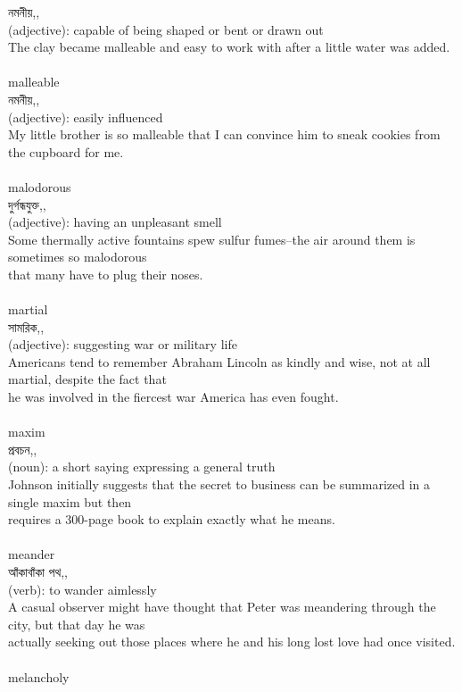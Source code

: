 \documentclass{article}
\begin{document}
{নমনীয়,,}\\
{(adjective): capable of being shaped or bent or drawn out\\The clay became malleable and easy to work with after a little water was added.\\}\\
{malleable}\\
{নমনীয়,,}\\
{(adjective): easily influenced\\My little brother is so malleable that I can convince him to sneak cookies from the cupboard for me.\\}\\
{malodorous}\\
{দুর্গন্ধযুক্ত,,}\\
{(adjective): having an unpleasant smell\\Some thermally active fountains spew sulfur fumes--the air around them is sometimes so malodorous\\that many have to plug their noses.\\}\\
{martial}\\
{সামরিক,,}\\
{(adjective): suggesting war or military life\\Americans tend to remember Abraham Lincoln as kindly and wise, not at all martial, despite the fact that\\he was involved in the fiercest war America has even fought.\\}\\
{maxim}\\
{প্রবচন,,}\\
{(noun): a short saying expressing a general truth\\Johnson initially suggests that the secret to business can be summarized in a single maxim but then\\requires a 300-page book to explain exactly what he means.\\}\\
{meander}\\
{আঁকাবাঁকা পথ,,}\\
{(verb): to wander aimlessly\\A casual observer might have thought that Peter was meandering through the city, but that day he was\\actually seeking out those places where he and his long lost love had once visited.\\}\\
{melancholy}\\
\end{document}
